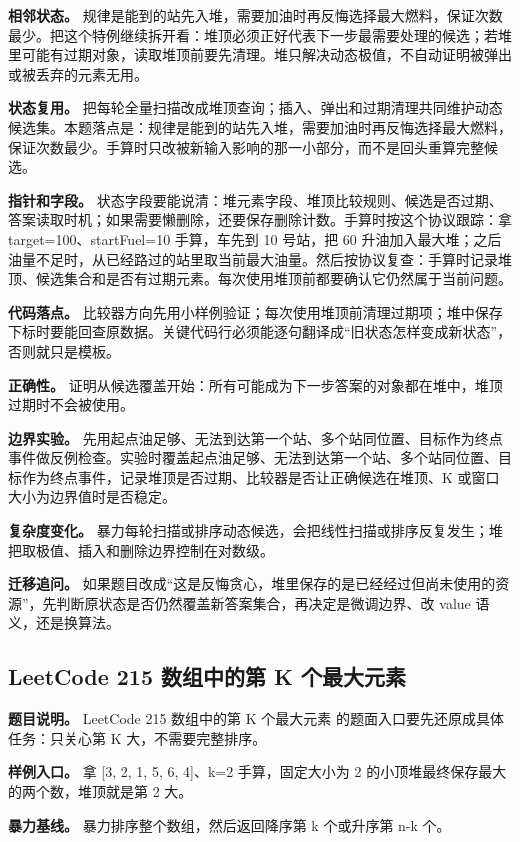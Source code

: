 \textbf{相邻状态。} 规律是能到的站先入堆，需要加油时再反悔选择最大燃料，保证次数最少。把这个特例继续拆开看：堆顶必须正好代表下一步最需要处理的候选；若堆里可能有过期对象，读取堆顶前要先清理。堆只解决动态极值，不自动证明被弹出或被丢弃的元素无用。

\textbf{状态复用。} 把每轮全量扫描改成堆顶查询；插入、弹出和过期清理共同维护动态候选集。本题落点是：规律是能到的站先入堆，需要加油时再反悔选择最大燃料，保证次数最少。手算时只改被新输入影响的那一小部分，而不是回头重算完整候选。

\textbf{指针和字段。} 状态字段要能说清：堆元素字段、堆顶比较规则、候选是否过期、答案读取时机；如果需要懒删除，还要保存删除计数。手算时按这个协议跟踪：拿 target=100、startFuel=10 手算，车先到 10 号站，把 60 升油加入最大堆；之后油量不足时，从已经路过的站里取当前最大油量。然后按协议复查：手算时记录堆顶、候选集合和是否有过期元素。每次使用堆顶前都要确认它仍然属于当前问题。

\textbf{代码落点。} 比较器方向先用小样例验证；每次使用堆顶前清理过期项；堆中保存下标时要能回查原数据。关键代码行必须能逐句翻译成“旧状态怎样变成新状态”，否则就只是模板。

\textbf{正确性。} 证明从候选覆盖开始：所有可能成为下一步答案的对象都在堆中，堆顶过期时不会被使用。

\textbf{边界实验。} 先用起点油足够、无法到达第一个站、多个站同位置、目标作为终点事件做反例检查。实验时覆盖起点油足够、无法到达第一个站、多个站同位置、目标作为终点事件，记录堆顶是否过期、比较器是否让正确候选在堆顶、K 或窗口大小为边界值时是否稳定。

\textbf{复杂度变化。} 暴力每轮扫描或排序动态候选，会把线性扫描或排序反复发生；堆把取极值、插入和删除边界控制在对数级。

\textbf{迁移追问。} 如果题目改成“这是反悔贪心，堆里保存的是已经经过但尚未使用的资源”，先判断原状态是否仍然覆盖新答案集合，再决定是微调边界、改 value 语义，还是换算法。

\subsection{LeetCode 215 数组中的第 K 个最大元素}

\textbf{题目说明。} LeetCode 215 数组中的第 K 个最大元素 的题面入口要先还原成具体任务：只关心第 K 大，不需要完整排序。

\textbf{样例入口。} 拿 [3, 2, 1, 5, 6, 4]、k=2 手算，固定大小为 2 的小顶堆最终保存最大的两个数，堆顶就是第 2 大。

\textbf{暴力基线。} 暴力排序整个数组，然后返回降序第 k 个或升序第 n-k 个。

